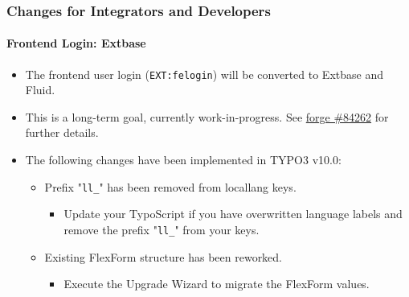 \begin{frame}[fragile]
	\frametitle{Changes for Integrators and Developers}
	\framesubtitle{Frontend Login: Extbase}

	\begin{itemize}
		\item The frontend user login (\texttt{EXT:felogin}) will be converted to Extbase and Fluid.

		\item This is a long-term goal, currently work-in-progress.\newline
			See \href{https://forge.typo3.org/issues/84262}{forge \#84262} for further details.

		\item The following changes have been implemented in TYPO3 v10.0:

		\begin{itemize}
			\item[\ding{202}] Prefix "\texttt{ll\_}" has been removed from locallang keys.

				\begin{itemize}
					\item[\ding{228}] Update your TypoScript if you have overwritten language labels and remove the prefix "\texttt{ll\_}" from your keys.
				\end{itemize}

			\item[\ding{203}] Existing FlexForm structure has been reworked.

				\begin{itemize}
					\item[\ding{228}] Execute the Upgrade Wizard to migrate the FlexForm values.
				\end{itemize}

		\end{itemize}

	\end{itemize}

\end{frame}


